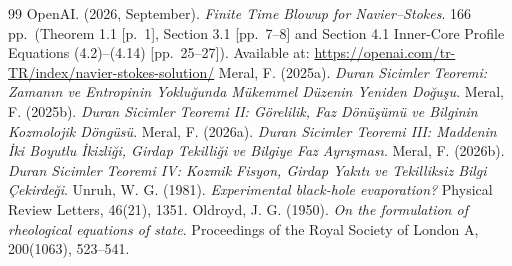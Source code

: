 \documentclass[12pt,a4paper]{article}
\begin{document}
\begin{thebibliography}{99}
     OpenAI. (2026, September). \textit{Finite Time Blowup for Navier--Stokes}. 166 pp.\ (Theorem 1.1 [p.\ 1], Section 3.1 [pp.\ 7--8] and Section 4.1 Inner-Core Profile Equations (4.2)--(4.14) [pp.\ 25--27]). Available at: \url{https://openai.com/tr-TR/index/navier-stokes-solution/}
     Meral, F. (2025a). \textit{Duran Sicimler Teoremi: Zamanın ve Entropinin Yokluğunda Mükemmel Düzenin Yeniden Doğuşu}.
     Meral, F. (2025b). \textit{Duran Sicimler Teoremi II: Görelilik, Faz Dönüşümü ve Bilginin Kozmolojik Döngüsü}.
     Meral, F. (2026a). \textit{Duran Sicimler Teoremi III: Maddenin İki Boyutlu İkizliği, Girdap Tekilliği ve Bilgiye Faz Ayrışması}.
     Meral, F. (2026b). \textit{Duran Sicimler Teoremi IV: Kozmik Fisyon, Girdap Yakıtı ve Tekilliksiz Bilgi Çekirdeği}.
     Unruh, W. G. (1981). \textit{Experimental black-hole evaporation?} Physical Review Letters, 46(21), 1351.
     Oldroyd, J. G. (1950). \textit{On the formulation of rheological equations of state}. Proceedings of the Royal Society of London A, 200(1063), 523--541.
\end{thebibliography}
\end{document}
